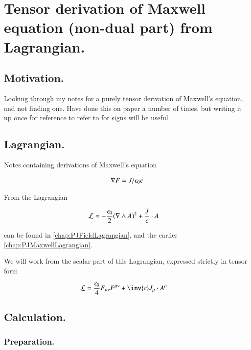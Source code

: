 \chapter{Tensor derivation of Maxwell equation (non-dual part) from Lagrangian. }
\date{ April 20, 2009.  Last Revision: $Date: 2009/06/04 13:13:27 $ }

\section{Motivation. }

Looking through my notes for a purely tensor derivation of Maxwell's equation, and not finding one.  Have done this on
paper a number of times, but writing it up once for reference to refer to for signs will be useful.

\section{Lagrangian. }

Notes containing derivations of Maxwell's equation

\begin{align}\label{eqn:maxTenLag:maxwell}
\nabla F = J/\epsilon_0 c
\end{align}

From the Lagrangian

\begin{align}\label{eqn:maxTenLag:maxlag}
\mathcal{L} &= -\frac{\epsilon_0}{2} (\nabla \wedge A)^2 + \frac{J}{c} \cdot A
\end{align}

can be found in \ref{chap:PJFieldLagrangian}, and the earlier \ref{chap:PJMaxwellLagrangian}.

We will work from the scalar part of this Lagrangian, expressed strictly in tensor form

\begin{align}
\LL &= \frac{\epsilon_0}{4} F_{\mu\nu}F^{\mu\nu} + \inv{c} J_\mu \cdot A^\mu
\end{align}

\section{Calculation. }

\subsection{Preparation. }

